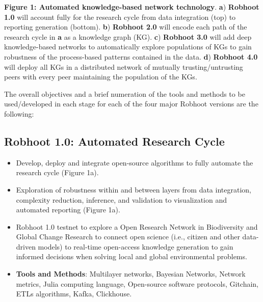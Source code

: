 \documentclass[10pt, a4paper, twocolumn]{article} %
\begin{document}
{  %
  {\small {\bf Figure 1: Automated knowledge-based network
      technology}. {\bf a}) {\bf Robhoot 1.0} will account fully for
    the research cycle from data integration (top) to reporting
    generation (bottom). {\bf b}) {\bf Robhoot 2.0} will encode each
    path of the research cycle in {\bf a} as a knowledge graph
    (KG). {\bf c}) {\bf Robhoot 3.0} will add deep knowledge-based
    networks to automatically explore populations of KGs to gain
    robustness of the process-based patterns contained in the
    data. {\bf d}) {\bf Robhoot 4.0} will deploy all KGs in a
    distributed network of mutually trusting/untrusting peers with
    every peer maintaining the population of the KGs.}
  
  The overall objectives and a brief numeration of the tools and
  methods to be used/developed in each stage for each of the four
  major Robhoot versions are the following:
  \vspace{-0.15 in}
  \subsection{Robhoot 1.0: Automated Research Cycle}
   \begin{itemize}
   \item Develop, deploy and integrate open-source algorithms to
     fully automate the research cycle (Figure 1a).
   \item Exploration of robustness within and between layers from data
     integration, complexity reduction, inference, and validation to
     visualization and automated reporting (Figure 1a).
   \item Robhoot 1.0 testnet to explore a Open Research Network in
     Biodiversity and Global Change Research to connect open science
     (i.e., citizen and other data-driven models) to real-time
     open-access knowledge generation to gain informed decisions when
     solving local and global environmental problems.
   \end{itemize}

   \begin{itemize}
   \item {\bf Tools and Methods}: Multilayer networks, Bayesian
     Networks, Network metrics, Julia computing language, Open-source
     software protocols, Gitchain, ETLs algorithms, Kafka, Clickhouse.
 \end{itemize}
 \vspace{-0.15 in}
   
}
\end{document}
